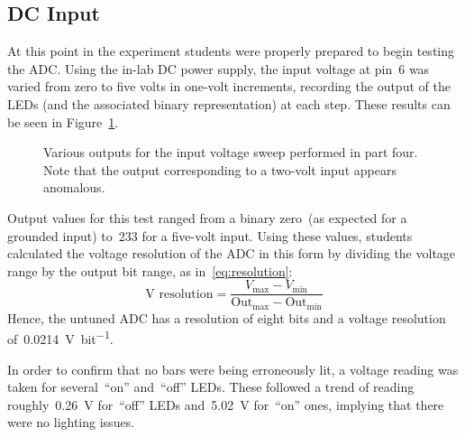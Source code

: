 \subsection{DC Input}
At this point in the experiment students were properly prepared to begin testing the ADC.  Using the in-lab DC power supply, the input voltage at pin~6 was varied from zero to five volts in one-volt increments, recording the output of the LEDs (and the associated binary representation) at each step.  These results can be seen in Figure~\ref{fig:pt4bars}.
%
\begin{figure}[H]
	\centering
	
	\parbox{.6\textwidth}{
	\caption[LED output for untuned ADC]{Various outputs for the input voltage sweep performed in part four.  Note that the output corresponding to a two-volt input appears anomalous.}
	\label{fig:pt4bars}}
\end{figure}
%
Output values for this test ranged from a binary zero~(as expected for a grounded input) to~233 for a five-volt input.  Using these values, students calculated the voltage resolution of the ADC in this form by dividing the voltage range by the output bit range, as in~\eqref{eq:resolution}:
%
\begin{equation}
	\text{V resolution} = \frac{V_\text{max} - V_\text{min}}{\text{Out}_\text{max} - \text{Out}_\text{min}}
	\label{eq:resolution}
\end{equation}
%
Hence, the untuned ADC has a resolution of eight bits and a voltage resolution of~\SI{0.0214}{\volt\per bit}.

In order to confirm that no bars were being erroneously lit, a voltage reading was taken for several~``on'' and~``off'' LEDs.  These followed a trend of reading roughly~\SI{0.26}{\volt} for~``off'' LEDs and~\SI{5.02}{\volt} for~``on'' ones, implying that there were no lighting issues.



\begin{figure}[H]
	\centering
	
\end{figure}

\begin{figure}[H]
	\centering
	
\end{figure}

